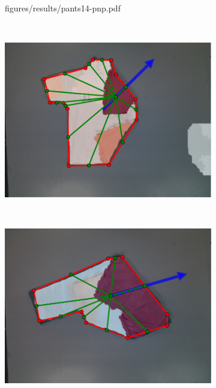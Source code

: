 \begin{figure}[htbp]
\begin{subfigure}[l]{\bigtablewidth}
    	{figures/results/pants14-pnp.pdf}
	\end{subfigure}
	~
    \begin{subfigure}[r]{\bigtablewidth}
	    \centering
    	\includegraphics[width=\textwidth]
    	{figures/results/polo13-pnp.pdf}
	\end{subfigure}
	~
    \begin{subfigure}[l]{\bigtablewidth}
	    \centering
    	\includegraphics[width=\textwidth]
    	{figures/results/pants15-pnp.pdf}
	\end{subfigure}
	~
    \begin{subfigure}[r]{\bigtablewidth}
	    \centering

\end{subfigure}
\end{figure}
